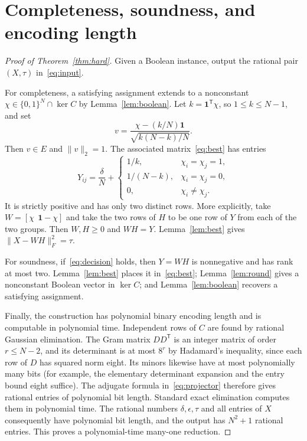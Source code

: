 \documentclass[11pt]{article}
\newcommand{\one}{\mathbf 1}
\begin{document}
\section{Completeness, soundness, and encoding length}
\begin{proof}[Proof of Theorem~\ref{thm:hard}]
Given a Boolean instance, output the rational pair $(X,\tau)$ in~\eqref{eq:input}.

For completeness, a satisfying assignment extends to a nonconstant $\chi\in\{0,1\}^N\cap\ker C$ by Lemma~\ref{lem:boolean}. Let $k=\one^{\mathsf T}\chi$, so $1\leq k\leq N-1$, and set
\[
 v=\frac{\chi-(k/N)\one}{\sqrt{k(N-k)/N}}.
\]
Then $v\in E$ and $\|v\|_2=1$. The associated matrix~\eqref{eq:best} has entries
\begin{equation}\label{eq:two-block}
 Y_{ij}=\frac\delta N+
 \begin{cases}
  1/k,&\chi_i=\chi_j=1,\\
  1/(N-k),&\chi_i=\chi_j=0,\\
  0,&\chi_i\ne\chi_j.
 \end{cases}
\end{equation}
It is strictly positive and has only two distinct rows. More explicitly, take $W=[\chi\ \ \one-\chi]$ and take the two rows of $H$ to be one row of $Y$ from each of the two groups. Then $W,H\geq0$ and $WH=Y$. Lemma~\ref{lem:best} gives $\|X-WH\|_F^2=\tau$.

For soundness, if~\eqref{eq:decision} holds, then $Y=WH$ is nonnegative and has rank at most two. Lemma~\ref{lem:best} places it in~\eqref{eq:best}; Lemma~\ref{lem:round} gives a nonconstant Boolean vector in $\ker C$; and Lemma~\ref{lem:boolean} recovers a satisfying assignment.

Finally, the construction has polynomial binary encoding length and is computable in polynomial time. Independent rows of $C$ are found by rational Gaussian elimination. The Gram matrix $DD^{\mathsf T}$ is an integer matrix of order $r\leq N-2$, and its determinant is at most $8^r$ by Hadamard's inequality, since each row of $D$ has squared norm eight. Its minors likewise have at most polynomially many bits (for example, the elementary determinant expansion and the entry bound eight suffice). The adjugate formula in~\eqref{eq:projector} therefore gives rational entries of polynomial bit length. Standard exact elimination computes them in polynomial time. The rational numbers $\delta,\epsilon,\tau$ and all entries of $X$ consequently have polynomial bit length, and the output has $N^2+1$ rational entries. This proves a polynomial-time many-one reduction.
\end{proof}
\end{document}
